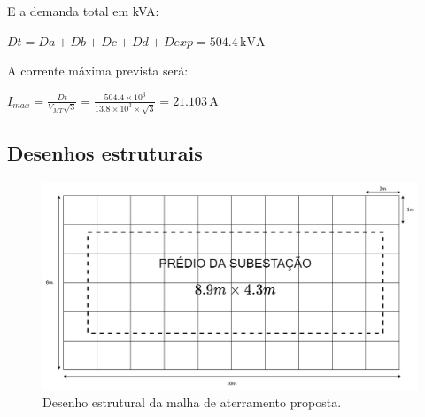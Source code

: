 E a demanda total em kVA:

\begin{center}
    $Dt = Da + Db + Dc + Dd + Dexp = 504.4 \, \text{kVA}$
\end{center}

A corrente máxima prevista será:

\begin{center}
    $I_{max} = \frac{Dt}{V_{MT} \sqrt{3}} = \frac{504.4 \times 10^3}{13.8 \times 10^3 \times \sqrt{3}} = 21.103 \, \text{A}$
\end{center}

\subsection{Desenhos estruturais}

\begin{figure}[H] 
\centering
\includegraphics[width=16cm]{Imagens/malha_aterramento.jpg}
\caption{Desenho estrutural da malha de aterramento proposta.}
\label{malha_terra} 
\end{figure}

\newpage

\vspace{60pt}
\begin{figure}[htbp!]
    \centering
    \vspace{10cm}
		  
	\label{se:1}
\end{figure}

\newpage

\vspace{60pt}
\begin{figure}[htbp!]
    \centering
    \vspace{10cm}
		  
	\label{se:2}
\end{figure}


